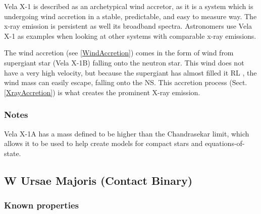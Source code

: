 \documentclass[12pt, a4paper]{article}
\begin{document}
        Vela X-1 is described as an archetypical wind accretor, as it is a system which is undergoing wind accretion in a stable, predictable, and easy to measure way. The x-ray emission is persistent as well its broadband spectra. Astronomers use Vela X-1 as examples when looking at other systems with comparable x-ray emissions. \cite{Kretschmar_2021}
        
        The wind accretion (see \ref{WindAccretion}) comes in the form of wind from supergiant star (Vela X-1B) falling onto the neutron star. This wind does not have a very high velocity, but because the supergiant has almost filled it RL \cite{Kretschmar_2021}, the wind mass can easily escape, falling onto the NS. This accretion process (Sect. \ref{XrayAccretion}) is what creates the prominent X-ray emission.

        \subsubsection{Notes}   
            Vela X-1A has a mass defined to be higher than the Chandrasekar limit, which allows it to be used to help create models for compact stars and equations-of-state. \cite{Kretschmar_2021}
        
    \subsection{\centering W Ursae Majoris (Contact Binary)}
        \subsubsection{Known properties}
\end{document}
